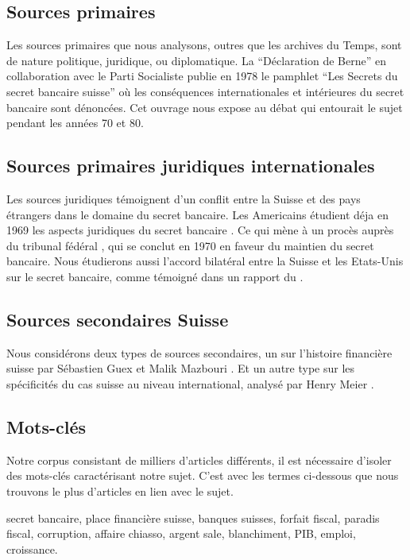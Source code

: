 \documentclass[11pt]{article}
\begin{document}
\subsection{Sources primaires}
Les sources primaires que nous analysons, outres que les archives du Temps, sont
de nature politique, juridique, ou diplomatique.
La “Déclaration de Berne” en collaboration avec le
Parti Socialiste publie en 1978 le pamphlet “Les Secrets du secret bancaire
suisse” \citep{GiovanniniPierLuigi1978Lsds} où les conséquences internationales
et intérieures du secret bancaire sont dénoncées. Cet ouvrage nous expose au
débat qui entourait le sujet pendant les années 70 et 80.

\subsection{Sources primaires juridiques internationales}
Les sources juridiques témoignent d'un conflit entre la Suisse et des pays
étrangers dans le domaine du secret bancaire.  Les Americains étudient déja en
1969 les aspects juridiques du secret bancaire \citep{Mueller69}. Ce qui mène à un
procès auprès du tribunal fédéral \citep{tribunalFederal70}, qui se
conclut en 1970 en faveur du maintien du secret bancaire.
Nous étudierons aussi l'accord bilatéral entre la Suisse et les Etats-Unis sur
le secret bancaire, comme témoigné dans un rapport du \citet{insiderTrading83}.

\subsection{Sources secondaires Suisse}
Nous considérons deux types de sources secondaires, un sur l’histoire financière suisse
 par Sébastien Guex et Malik Mazbouri \citep{Guex99, Guex00, Mazbouri12}.
Et un autre type sur les spécificités du cas suisse au niveau international, analysé par
Henry Meier \citep{Meier12}.

\subsection{Mots-clés}
Notre corpus consistant de milliers d'articles différents, il est nécessaire d'isoler des mots-clés
caractérisant notre sujet. C'est avec les termes ci-dessous que nous trouvons le plus d'articles
en lien avec le sujet.

secret bancaire, place financière suisse, banques suisses, forfait
fiscal, paradis fiscal, corruption, affaire chiasso, argent sale,
blanchiment, PIB, emploi, croissance.
\end{document}
